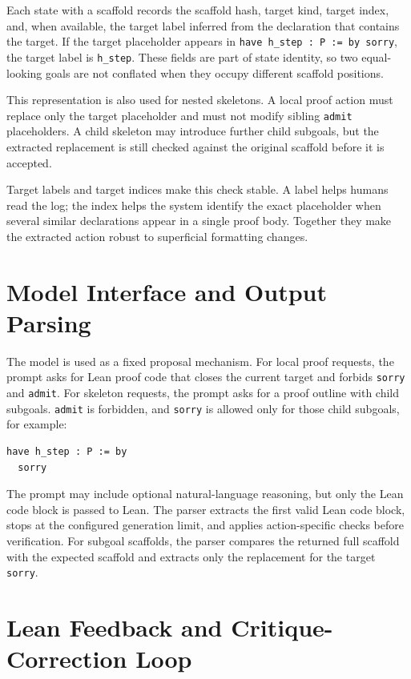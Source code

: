 Each state with a scaffold records the scaffold hash, target kind, target index, and, when available, the target label inferred from the declaration that contains the target. If the target placeholder appears in \texttt{have h\_step : P := by sorry}, the target label is \texttt{h\_step}. These fields are part of state identity, so two equal-looking goals are not conflated when they occupy different scaffold positions.

This representation is also used for nested skeletons. A local proof action must replace only the target placeholder and must not modify sibling \texttt{admit} placeholders. A child skeleton may introduce further child subgoals, but the extracted replacement is still checked against the original scaffold before it is accepted.

Target labels and target indices make this check stable. A label helps humans read the log; the index helps the system identify the exact placeholder when several similar declarations appear in a single proof body. Together they make the extracted action robust to superficial formatting changes.

\section{Model Interface and Output Parsing}

The model is used as a fixed proposal mechanism. For local proof requests, the prompt asks for Lean proof code that closes the current target and forbids \texttt{sorry} and \texttt{admit}. For skeleton requests, the prompt asks for a proof outline with child subgoals. \texttt{admit} is forbidden, and \texttt{sorry} is allowed only for those child subgoals, for example:
\begin{verbatim}
have h_step : P := by
  sorry
\end{verbatim}

The prompt may include optional natural-language reasoning, but only the Lean code block is passed to Lean. The parser extracts the first valid Lean code block, stops at the configured generation limit, and applies action-specific checks before verification. For subgoal scaffolds, the parser compares the returned full scaffold with the expected scaffold and extracts only the replacement for the target \texttt{sorry}.

\section{Lean Feedback and Critique-Correction Loop}
\label{subsec:lean-feedback}

